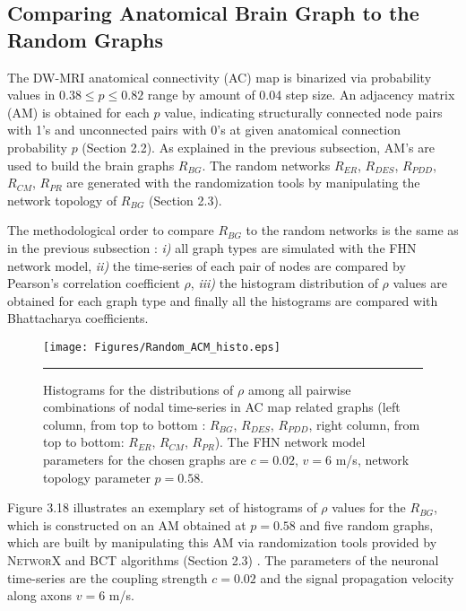 


\subsection{Comparing Anatomical Brain Graph to the Random Graphs}

The DW-MRI anatomical connectivity (AC) map is binarized via probability values in $0.38 \leq p \leq 0.82$ range by amount of 0.04 step size. An adjacency matrix (AM) is obtained for each $p$ value, indicating structurally connected node pairs with 1's and unconnected pairs with 0's at given anatomical connection probability $p$ (Section 2.2). As explained in the previous subsection, AM's are used to build the brain graphs $R_{BG}$. The random networks $R_{ER}$, $R_{DES}$, $R_{PDD}$, $R_{CM}$, $R_{PR}$ are generated with the randomization tools by manipulating the network topology of $R_{BG}$ (Section 2.3). 

The methodological order to compare $R_{BG}$ to the random networks is the same as in the previous subsection : \textit{i)} all graph types are simulated with the FHN network model, \textit{ii)} the time-series of each pair of nodes are compared by Pearson's correlation coefficient $\rho$, \textit{iii)} the histogram distribution of $\rho$ values are obtained for each graph type and finally all the histograms are compared with Bhattacharya coefficients. 

\begin{figure}[htbp] 
  \centering
	 \texttt{[image: Figures/Random\_ACM\_histo.eps]}
	 \rule{35em}{0.5pt}
  \caption[Histogram Comparison, ACM]{Histograms for the  distributions of $\rho$ among all pairwise combinations of nodal time-series in AC map related graphs (left column, from top to bottom : $R_{BG}$, $R_{DES}$, $R_{PDD}$, right column, from top to bottom: $R_{ER}$, $R_{CM}$, $R_{PR}$).  The FHN network model parameters for the chosen graphs are $c=0.02$, $v=6$ m/s, network topology parameter $p=0.58$. } 
    \label{fig:Histogram Comparison, ACM}
\end{figure}  

Figure 3.18 illustrates an exemplary set of histograms of $\rho$ values for the $R_{BG}$, which is constructed on an AM obtained at $p=0.58$ and five random graphs, which are built by manipulating this AM via randomization tools provided by \textsc{NetworX} and \textsc{BCT} algorithms (Section 2.3) \citep{XYZNETW, XYZBCT}. The parameters of the neuronal time-series are the coupling strength $c=0.02$ and the signal propagation velocity along axons $v=6$ m/s.   

